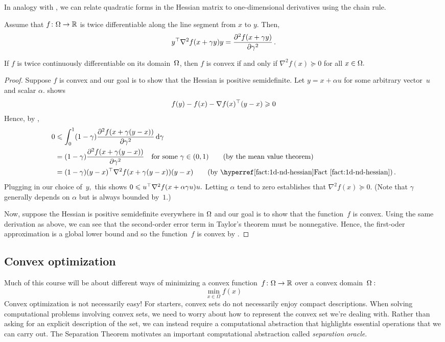In analogy with , we can relate quadratic forms in the
Hessian matrix to one-dimensional derivatives using the chain rule.
\begin{fact}
Assume that $f\colon\Omega\to\mathbb{R}$ is twice differentiable along the line segment from $x$ to $y.$ Then,
\[
y^\top \nabla^2f(x+\gamma y)y 
= \frac{\partial^2f(x+\gamma y)}{\partial\gamma^2}\,.
\]
\end{fact}

\begin{proposition}
If $f$ is twice continuously differentiable on its domain~$\Omega$, then $f$ is convex if and only if $\nabla^2 f(x)\succeq 0$ for all $x\in\Omega.$ 
\end{proposition}
\begin{proof}
Suppose $f$ is convex and our goal is to show that the Hessian is positive semidefinite. 
Let $y=x + \alpha u$ for some arbitrary vector~$u$ and scalar $\alpha.$
 shows
\[
f(y) - f(x) -\nabla f(x)^\top (y-x) \geqslant 0
\]
Hence, by ,
\begin{align*}
0&\le  \int_0^1 (1-\gamma)\frac{\partial^2 f(x+\gamma(y-x))}{\partial\gamma^2}\rd\gamma\\
&=  (1-\gamma)\frac{\partial^2 f(x+\gamma(y-x))}{\partial\gamma^2}
\quad\text{for some $\gamma\in(0,1)$} \tag{by the mean value theorem}\\
&= (1-\gamma)(y-x)^\trans \nabla^2 f(x+\gamma (y-x))(y-x) 
\tag{by \factref{1d-nd-hessian}}\,.
\end{align*}
Plugging in our choice of~$y,$ this shows $0\leqslant u^\top \nabla^2
f(x+\alpha\gamma u)u.$ Letting $\alpha$ tend to zero establishes that $\nabla^2
f(x)\succeq 0.$ (Note that $\gamma$ generally depends on $\alpha$ but is always
bounded by~$1.$)

Now, suppose the Hessian is positive semidefinite everywhere in $\Omega$ and
our goal is to show that  the function~$f$ is convex.  Using the same derivation
as above, we can see that the second-order error term in Taylor's theorem must
be nonnegative. Hence, the first-oder approximation is
a global lower bound and so the function~$f$ is convex by
.
\end{proof}

\subsection{Convex optimization}
Much of this course will be about different ways of minimizing a convex function~$f\colon\Omega\to\mathbb{R}$ over a convex domain~$\Omega:$ 
\[
\min_{x\in \Omega} f(x)
\]
Convex optimization is not necessarily easy! 
For starters, convex sets do not necessarily enjoy compact descriptions. When solving computational problems involving convex sets, we need to worry about how to represent the convex set we're dealing with. Rather than asking for an explicit description of the set, we can instead require a computational abstraction that highlights essential operations that we can carry out. The Separation Theorem motivates an important computational abstraction called \emph{separation oracle}.

